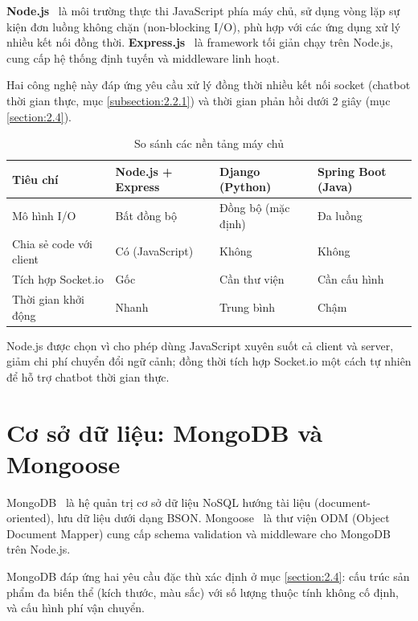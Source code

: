 \documentclass[../DoAn.tex]{subfiles}
\begin{document}
\textbf{Node.js}~\cite{nodejs} là môi trường thực thi JavaScript phía máy chủ, sử
dụng vòng lặp sự kiện đơn luồng không chặn (non-blocking I/O), phù hợp với các
ứng dụng xử lý nhiều kết nối đồng thời. \textbf{Express.js}~\cite{expressjs} là
framework tối giản chạy trên Node.js, cung cấp hệ thống định tuyến và middleware
linh hoạt.

Hai công nghệ này đáp ứng yêu cầu xử lý đồng thời nhiều kết nối socket (chatbot
thời gian thực, mục \ref{subsection:2.2.1}) và thời gian phản hồi dưới 2 giây
(mục \ref{section:2.4}).

\begin{table}[H]
\centering
\caption{So sánh các nền tảng máy chủ}
\label{tab:backend}
\begin{tabular}{|p{3cm}|p{3cm}|p{3cm}|p{3cm}|}
\hline
\textbf{Tiêu chí} & \textbf{Node.js + \break Express} & \textbf{Django (Python)} & \textbf{Spring Boot (Java)} \\
\hline
Mô hình I/O & Bất đồng bộ & Đồng bộ (mặc định) & Đa luồng \\
\hline
Chia sẻ code với client & Có (JavaScript) & Không & Không \\
\hline
Tích hợp Socket.io & Gốc & Cần thư viện & Cần cấu hình \\
\hline
Thời gian khởi động & Nhanh & Trung bình & Chậm \\
\hline
\end{tabular}
\end{table}

Node.js được chọn vì cho phép dùng JavaScript xuyên suốt cả client và server,
giảm chi phí chuyển đổi ngữ cảnh; đồng thời tích hợp Socket.io một cách tự nhiên
để hỗ trợ chatbot thời gian thực.

\section{Cơ sở dữ liệu: MongoDB và Mongoose}
\label{section:3.3}

MongoDB~\cite{mongodb} là hệ quản trị cơ sở dữ liệu NoSQL hướng tài liệu (document-
oriented), lưu dữ liệu dưới dạng BSON. Mongoose~\cite{mongoose} là thư viện ODM
(Object Document Mapper) cung cấp schema validation và middleware cho MongoDB trên
Node.js.

MongoDB đáp ứng hai yêu cầu đặc thù xác định ở mục \ref{section:2.4}: cấu trúc
sản phẩm đa biến thể (kích thước, màu sắc) với số lượng thuộc tính không cố định,
và cấu hình phí vận chuyển.
\end{document}
